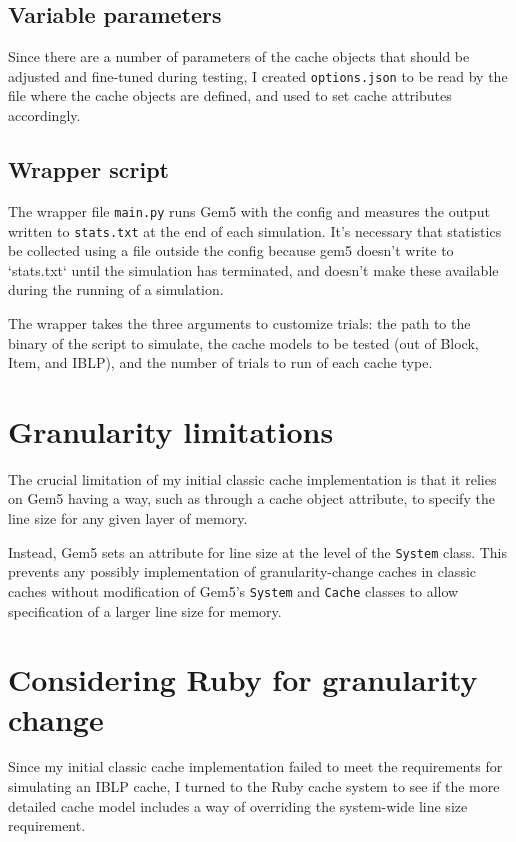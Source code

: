 \documentclass[12pt,twoside]{reedthesis}
\begin{document}
	\subsection*{Variable parameters}

	Since there are a number of parameters of the cache objects that should be adjusted and fine-tuned during testing, I created \verb`options.json` to be read by the file where the cache objects are defined, and used to set cache attributes accordingly.

	\subsection*{Wrapper script}

	The wrapper file \verb`main.py` runs Gem5 with the config and measures the output written to \verb`stats.txt` at the end of each simulation. It's necessary that statistics be collected using a file outside the config because gem5 doesn't write to `stats.txt` until the simulation has terminated, and doesn't make these available during the running of a simulation.

	The wrapper takes the three arguments to customize trials: the path to the binary of the script to simulate, the cache models to be tested (out of Block, Item, and IBLP), and the number of trials to run of each cache type.

\section{Granularity limitations}

	The crucial limitation of my initial classic cache implementation is that it relies on Gem5 having a way, such as through a cache object attribute, to specify the line size for any given layer of memory.

	Instead, Gem5 sets an attribute for line size at the level of the \verb`System` class. This prevents any possibly implementation of granularity-change caches in classic caches without modification of Gem5's \verb`System` and \verb`Cache` classes to allow specification of a larger line size for memory.


\section{Considering Ruby for granularity change}

	Since my initial classic cache implementation failed to meet the requirements for simulating an IBLP cache, I turned to the Ruby cache system to see if the more detailed cache model includes a way of overriding the system-wide line size requirement.
\end{document}
